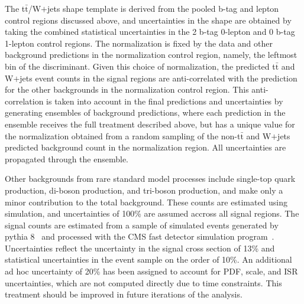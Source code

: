 The t$\bar{\text{t}}$/W$+$jets shape template is derived from the pooled b-tag and lepton control regions discussed above, and uncertainties in the shape are obtained by taking the combined statistical uncertainties in the 2 b-tag 0-lepton and 0 b-tag 1-lepton control regions. The normalization is fixed by the data and other background predictions in the normalization control region, namely, the leftmost bin of the discriminant. 
Given this choice of normalization, the predicted t$\bar{\text{t}}$ and W$+$jets event counts in the signal regions are anti-correlated with the prediction for the other backgrounds in the normalization control region. This anti-correlation is taken into account in the final predictions and uncertainties by generating ensembles of background predictions, where each prediction in the ensemble receives the full treatment described above, but has a unique value for the normalization obtained from a random sampling of the non-t$\bar{\text{t}}$ and W$+$jets predicted background count in the normalization region. All uncertainties are propagated through the ensemble.

Other backgrounds from rare standard model processes include single-top quark production, di-boson production, and tri-boson production, and make only a minor contribution to the total background. These counts are estimated using simulation, and uncertainties of 100\% are assumed accross all signal regions. The signal counts are estimated from a sample of simulated events generated by {\sc pythia} 8~\cite{Sjostrand:2006za} and processed with the CMS fast detector simulation program~\cite{Abdullin:2011zz}. Uncertainties reflect the uncertainty in the signal cross section of 13\% and statistical uncertainties in the event sample on the order of 10\%. An additional ad hoc uncertainty of 20\% has been assigned to account for PDF, scale, and ISR uncertainties, which are not computed directly due to time constraints. This treatment should be improved in future iterations of the analysis. 

